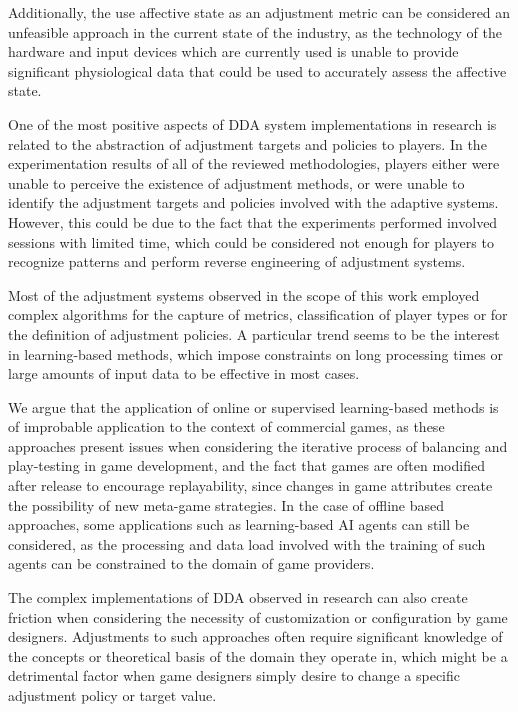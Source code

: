 Additionally, the use affective state as an adjustment metric can be considered an unfeasible approach in the current state of the industry, as the technology of the hardware and input devices which are currently used is unable to provide significant physiological data that could be used to accurately assess the affective state. 

One of the most positive aspects of DDA system implementations in research is related to the abstraction of adjustment targets and policies to players. In the experimentation results of all of the reviewed methodologies, players either were unable to perceive the existence of adjustment methods, or were unable to identify the adjustment targets and policies involved with the adaptive systems. However, this could be due to the fact that the experiments performed involved sessions with limited time, which could be considered not enough for players to recognize patterns and perform reverse engineering of adjustment systems.

Most of the adjustment systems observed in the scope of this work employed complex algorithms for the capture of metrics, classification of player types or for the definition of adjustment policies. A particular trend seems to be the interest in learning-based methods, which impose constraints on long processing times or large amounts of input data to be effective in most cases.

We argue that the application of online or supervised learning-based methods is of improbable application to the context of commercial games, as these approaches present issues when considering the iterative process of balancing and play-testing in game development, and the fact that games are often modified after release to encourage replayability, since changes in game attributes create the possibility of new meta-game strategies. In the case of offline based approaches, some applications such as learning-based AI agents can still be considered, as the processing and data load involved with the training of such agents can be constrained to the domain of game providers.

The complex implementations of DDA observed in research can also create friction when considering the necessity of customization or configuration by game designers. Adjustments to such approaches often require significant knowledge of the concepts or theoretical basis of the domain they operate in, which might be a detrimental factor when game designers simply desire to change a specific adjustment policy or target value.

